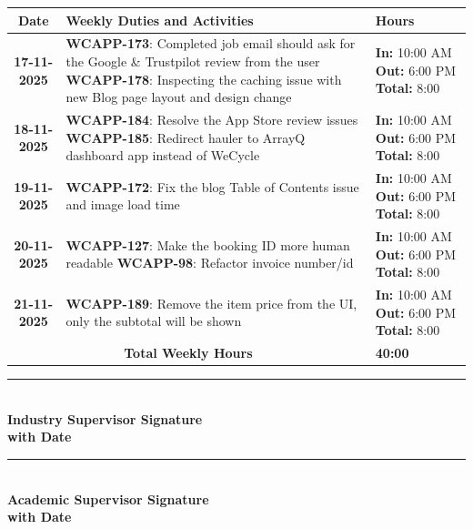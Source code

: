 \documentclass[a4paper,11pt]{article}
\begin{document}
\begin{tabularx}{\textwidth}{|c|>{\raggedright\arraybackslash}X|>{\centering\arraybackslash}m{3.5cm}|}
\hline
\rowcolor{gray!30}
\textbf{Date} & \textbf{Weekly Duties and Activities} & \textbf{Hours} \\
\hline
\textbf{17-11-2025} & \textbf{WCAPP-173}: Completed job email should ask for the Google \& Trustpilot review from the user \newline \textbf{WCAPP-178}: Inspecting the caching issue with new Blog page layout and design change & \textbf{In:} 10:00 AM \newline \textbf{Out:} 6:00 PM \newline \textbf{Total:} 8:00 \\
\hline
\textbf{18-11-2025} & \textbf{WCAPP-184}: Resolve the App Store review issues \newline \textbf{WCAPP-185}: Redirect hauler to ArrayQ dashboard app instead of WeCycle & \textbf{In:} 10:00 AM \newline \textbf{Out:} 6:00 PM \newline \textbf{Total:} 8:00 \\
\hline
\textbf{19-11-2025} & \textbf{WCAPP-172}: Fix the blog Table of Contents issue and image load time & \textbf{In:} 10:00 AM \newline \textbf{Out:} 6:00 PM \newline \textbf{Total:} 8:00 \\
\hline
\textbf{20-11-2025} & \textbf{WCAPP-127}: Make the booking ID more human readable \newline \textbf{WCAPP-98}: Refactor invoice number/id & \textbf{In:} 10:00 AM \newline \textbf{Out:} 6:00 PM \newline \textbf{Total:} 8:00 \\
\hline
\textbf{21-11-2025} & \textbf{WCAPP-189}: Remove the item price from the UI, only the subtotal will be shown & \textbf{In:} 10:00 AM \newline \textbf{Out:} 6:00 PM \newline \textbf{Total:} 8:00 \\
\hline
\multicolumn{2}{|c|}{\textbf{Total Weekly Hours}} & \textbf{40:00} \\
\hline
\end{tabularx}

\vspace{3em}

\noindent
\begin{minipage}[t]{0.45\textwidth}
\rule{0.8\textwidth}{0.4pt} \\
\textbf{Industry Supervisor Signature} \\
\textbf{with Date}
\end{minipage}
\hfill
\begin{minipage}[t]{0.45\textwidth}
\rule{0.8\textwidth}{0.4pt} \\
\textbf{Academic Supervisor Signature} \\
\textbf{with Date}
\end{minipage}
\end{document}
